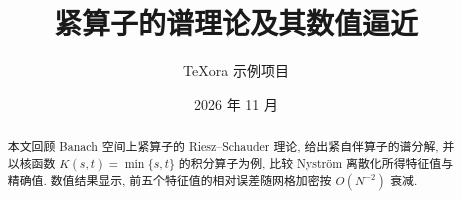 \documentclass[11pt,a4paper]{ctexart}
\title{紧算子的谱理论及其数值逼近}
\author{TeXora 示例项目}
\date{2026 年 11 月}
\begin{document}
\maketitle

\begin{abstract}
本文回顾 Banach 空间上紧算子的 Riesz--Schauder 理论, 给出紧自伴算子的谱分解, 并以核函数 $K(s,t)=\min\{s,t\}$ 的积分算子为例, 比较 Nyström 离散化所得特征值与精确值. 数值结果显示, 前五个特征值的相对误差随网格加密按 $O(N^{-2})$ 衰减.
\end{abstract}

\tableofcontents







\appendix




\end{document}
